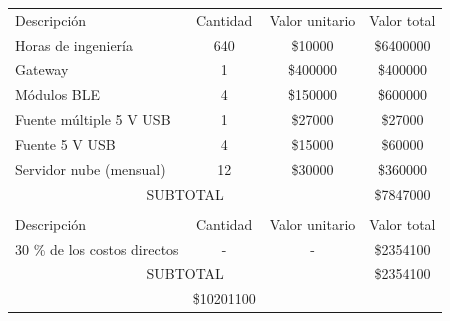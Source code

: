 \documentclass[
11pt, %
]{charter}
\begin{document}
\begin{table}[htpb]
\centering
\begin{tabularx}{\linewidth}{@{}|X|c|r|r|@{}}
\hline
\rowcolor[HTML]{C0C0C0} 
\multicolumn{4}{|c|}{\cellcolor[HTML]{C0C0C0}COSTOS DIRECTOS} \\ \hline
\rowcolor[HTML]{C0C0C0} 
Descripción & 
  \multicolumn{1}{c|}{\cellcolor[HTML]{C0C0C0}Cantidad} &
  \multicolumn{1}{c|}{\cellcolor[HTML]{C0C0C0}Valor unitario} &
  \multicolumn{1}{c|}{\cellcolor[HTML]{C0C0C0}Valor total} \\ \hline
Horas de ingeniería & 
  \multicolumn{1}{c|}{640} &
  \multicolumn{1}{c|}{\$10000} &
  \multicolumn{1}{c|}{\$6400000} \\ \hline
Gateway &
  \multicolumn{1}{c|}{1} &
  \multicolumn{1}{c|}{\$400000} &
  \multicolumn{1}{c|}{\$400000} \\ \hline
Módulos BLE & 
  \multicolumn{1}{c|}{4} &
  \multicolumn{1}{c|}{\$150000} &
  \multicolumn{1}{c|}{\$600000} \\ \hline
Fuente múltiple 5 V USB & 
  \multicolumn{1}{c|}{1} &
  \multicolumn{1}{c|}{\$27000} &
  \multicolumn{1}{c|}{\$27000} \\ \hline
Fuente 5 V USB &
  \multicolumn{1}{c|}{4} &
  \multicolumn{1}{c|}{\$15000} &
  \multicolumn{1}{c|}{\$60000} \\ \hline
Servidor nube (mensual) &
  \multicolumn{1}{c|}{12} &
  \multicolumn{1}{c|}{\$30000} &
  \multicolumn{1}{c|}{\$360000} \\ \hline
\multicolumn{3}{|c|}{SUBTOTAL} &
  \multicolumn{1}{c|}{\$7847000} \\ \hline
\rowcolor[HTML]{C0C0C0} 
\multicolumn{4}{|c|}{\cellcolor[HTML]{C0C0C0}COSTOS INDIRECTOS} \\ \hline
\rowcolor[HTML]{C0C0C0} 
Descripción &
  \multicolumn{1}{c|}{\cellcolor[HTML]{C0C0C0}Cantidad} &
  \multicolumn{1}{c|}{\cellcolor[HTML]{C0C0C0}Valor unitario} &
  \multicolumn{1}{c|}{\cellcolor[HTML]{C0C0C0}Valor total} \\ \hline
30 \% de los costos directos  & 
  \multicolumn{1}{c|}{-} &
  \multicolumn{1}{c|}{-} &
  \multicolumn{1}{c|}{\$2354100} \\ \hline
\multicolumn{3}{|c|}{SUBTOTAL} &
  \multicolumn{1}{c|}{\$2354100} \\ \hline
\rowcolor[HTML]{C0C0C0}
\multicolumn{3}{|c|}{TOTAL} & \$10201100
   \\ \hline
\end{tabularx}%
\end{table}
\end{document}
